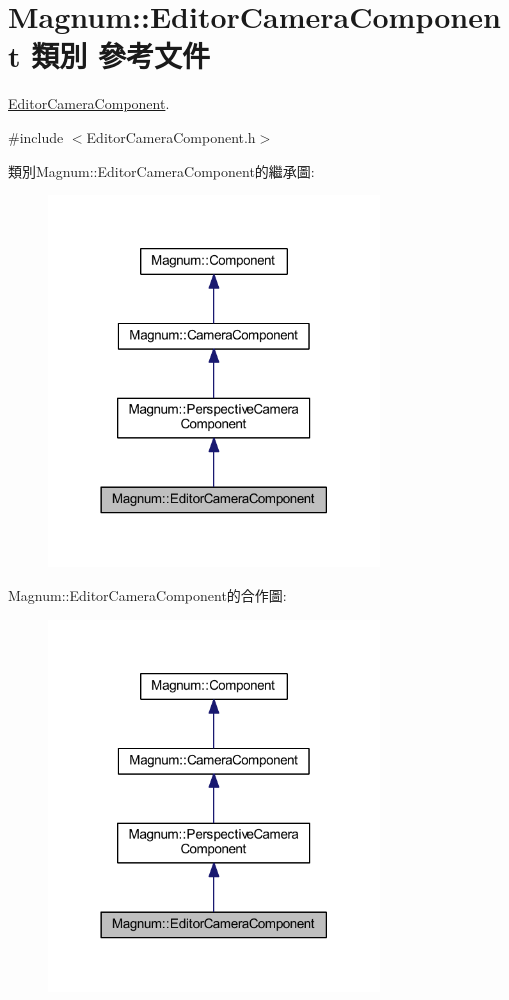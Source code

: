 \hypertarget{class_magnum_1_1_editor_camera_component}{}\section{Magnum\+:\+:Editor\+Camera\+Component 類別 參考文件}
\label{class_magnum_1_1_editor_camera_component}


\hyperlink{class_magnum_1_1_editor_camera_component}{Editor\+Camera\+Component}.  




{\ttfamily \#include $<$Editor\+Camera\+Component.\+h$>$}



類別\+Magnum\+:\+:Editor\+Camera\+Component的繼承圖\+:\nopagebreak
\begin{figure}[H]
\begin{center}
\leavevmode
\includegraphics[width=249pt]{class_magnum_1_1_editor_camera_component__inherit__graph}
\end{center}
\end{figure}


Magnum\+:\+:Editor\+Camera\+Component的合作圖\+:\nopagebreak
\begin{figure}[H]
\begin{center}
\leavevmode
\includegraphics[width=249pt]{class_magnum_1_1_editor_camera_component__coll__graph}
\end{center}
\end{figure}
